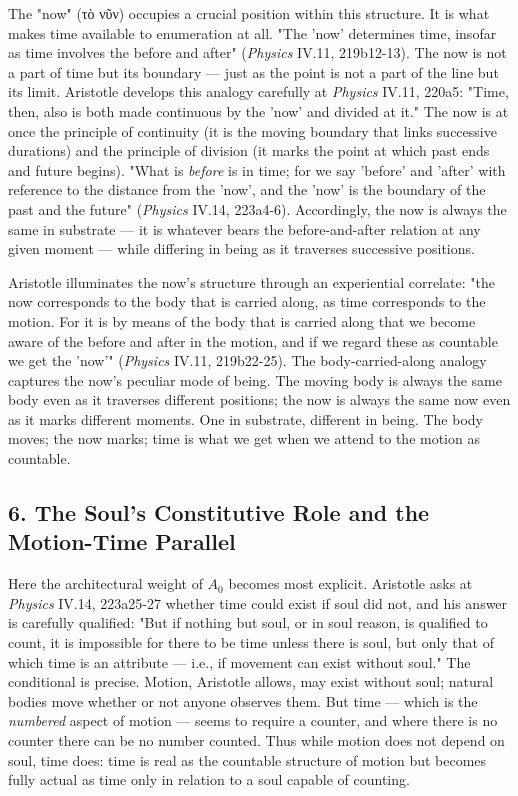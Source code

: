 \documentclass[12pt]{article}
\newcommand{\gk}[1]{{\greekfont #1}}%
\newcommand{\gk}[1]{{\greekfont #1}}%
\newcommand{\gk}[1]{#1}%
\begin{document}
The "now" (\gk{τὸ νῦν}) occupies a crucial position within this structure. It is what makes time available to enumeration at all. "The 'now' determines time, insofar as time involves the before and after" (\textit{Physics} IV.11, 219b12-13). The now is not a part of time but its boundary --- just as the point is not a part of the line but its limit. Aristotle develops this analogy carefully at \textit{Physics} IV.11, 220a5: "Time, then, also is both made continuous by the 'now' and divided at it." The now is at once the principle of continuity (it is the moving boundary that links successive durations) and the principle of division (it marks the point at which past ends and future begins). "What is \textit{before} is in time; for we say 'before' and 'after' with reference to the distance from the 'now', and the 'now' is the boundary of the past and the future" (\textit{Physics} IV.14, 223a4-6). Accordingly, the now is always the same in substrate --- it is whatever bears the before-and-after relation at any given moment --- while differing in being as it traverses successive positions.

Aristotle illuminates the now's structure through an experiential correlate: "the now corresponds to the body that is carried along, as time corresponds to the motion. For it is by means of the body that is carried along that we become aware of the before and after in the motion, and if we regard these as countable we get the 'now'" (\textit{Physics} IV.11, 219b22-25). The body-carried-along analogy captures the now's peculiar mode of being. The moving body is always the same body even as it traverses different positions; the now is always the same now even as it marks different moments. One in substrate, different in being. The body moves; the now marks; time is what we get when we attend to the motion as countable.

\subsection*{6. The Soul's Constitutive Role and the Motion-Time Parallel}

Here the architectural weight of $A_0$ becomes most explicit. Aristotle asks at \textit{Physics} IV.14, 223a25-27 whether time could exist if soul did not, and his answer is carefully qualified: "But if nothing but soul, or in soul reason, is qualified to count, it is impossible for there to be time unless there is soul, but only that of which time is an attribute --- i.e., if movement can exist without soul." The conditional is precise. Motion, Aristotle allows, may exist without soul; natural bodies move whether or not anyone observes them. But time --- which is the \textit{numbered} aspect of motion --- seems to require a counter, and where there is no counter there can be no number counted. Thus while motion does not depend on soul, time does: time is real as the countable structure of motion but becomes fully actual as time only in relation to a soul capable of counting.
\end{document}
